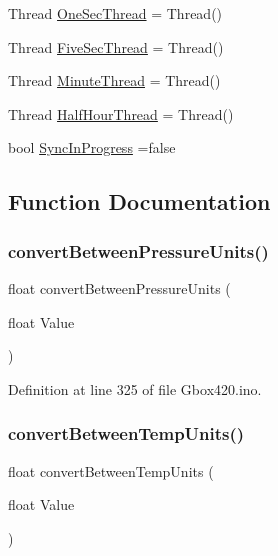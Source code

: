 \begin{DoxyCompactItemize}
\item 
Thread \mbox{\hyperlink{_gbox420_8ino_a1254144f7fb7ab5a6e4610e1ba94a2b9}{One\+Sec\+Thread}} = Thread()
\item 
Thread \mbox{\hyperlink{_gbox420_8ino_a53a9d8bb350581bc4ffb215418731b79}{Five\+Sec\+Thread}} = Thread()
\item 
Thread \mbox{\hyperlink{_gbox420_8ino_a2ddf18e39c01b0be11987f5625da3a48}{Minute\+Thread}} = Thread()
\item 
Thread \mbox{\hyperlink{_gbox420_8ino_a359176578bc209968ff3b7588370835d}{Half\+Hour\+Thread}} = Thread()
\item 
bool \mbox{\hyperlink{_gbox420_8ino_a6efffa16bd9cffe1ac626d2c5a73113e}{Sync\+In\+Progress}} =false
\end{DoxyCompactItemize}


\subsection{Function Documentation}
\mbox{\label{_gbox420_8ino_af5faad5ff5382f6d56651869e8736809}} 
\subsubsection{\texorpdfstring{convertBetweenPressureUnits()}{convertBetweenPressureUnits()}}
{\footnotesize\ttfamily float convert\+Between\+Pressure\+Units (\begin{DoxyParamCaption}\item[{float}]{Value }\end{DoxyParamCaption})}



Definition at line 325 of file Gbox420.\+ino.

\mbox{\label{_gbox420_8ino_ac3c5e4580e7b7eb984177631c03466e1}} 
\subsubsection{\texorpdfstring{convertBetweenTempUnits()}{convertBetweenTempUnits()}}
{\footnotesize\ttfamily float convert\+Between\+Temp\+Units (\begin{DoxyParamCaption}\item[{float}]{Value }\end{DoxyParamCaption})}



